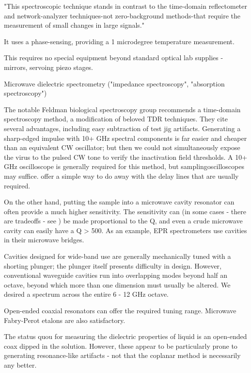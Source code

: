 \documentclass[paper.tex]{subfiles}
\begin{document}
"This spectroscopic technique stands in contrast to the time-domain reflectometer and network-analyzer techniques-not
zero-background methods-that require the measurement of small changes in large signals."

It uses a phase-sensing, providing a 1 microdegree temperature measurement.

This requires no special equipment beyond standard optical lab supplies - mirrors, servoing piezo stages.


Microwave dielectric spectrometry ("impedance spectroscopy", "absorption spectroscopy")

The notable Feldman biological spectroscopy group recommends a time-domain spectroscopy method\cite{Time2003a}, a modification of beloved TDR techniques. They cite several advantages, including easy subtraction of test jig artifacts.
Generating a sharp-edged impulse with 10+ GHz spectral components is far easier and cheaper than an equivalent CW oscillator; but then we could not simultaneously expose the virus to the pulsed CW tone to verify the inactivation field thresholds.
A 10+ GHz oscilloscope is generally required for this method, but sampling\footnotemark oscilloscopes may suffice. \cite{16psresolution2003} offer a simple way to do away with the delay lines that are usually required.


On the other hand, putting the sample into a microwave cavity resonator can often provide a much higher sensitivity. The sensitivity can (in some cases - there are tradeoffs - see \cite{FabryPerot1982}) be made proportional to the Q, and even a crude microwave cavity can easily have a Q > 500.
As an example, EPR spectrometers use cavities in their microwave bridges.

Cavities designed for wide-band use are generally mechanically tuned with a shorting plunger; the plunger itself presents difficulty in design\cite{Contactless2019}.
However, conventional waveguide cavities run into overlapping modes beyond half an octave, beyond which more than one dimension must usually be altered. We desired a spectrum across the entire 6 - 12 GHz octave.

Open-ended coaxial resonators can offer the required tuning range\cite{Wideband1981}\cite{Study2014a}. Microwave Fabry-Perot etalons are also satisfactory.\cite{FabryPerot1982}

The status quou for measuring the dielectric properties of liquid is an open-ended coax dipped in the solution\cite{Coaxial1980}. However, these appear to be particularly prone to generating resonance-like artifacts - not that the coplanar method is necessarily any better.
\end{document}
